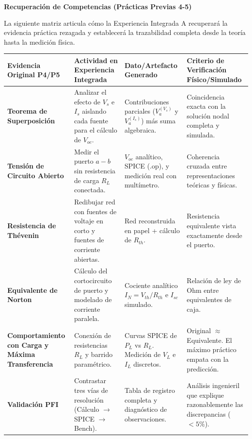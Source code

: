\documentclass[11pt, a4paper]{article}
\begin{document}
\begin{tcolorbox}[colback=ucbblue!5!white, colframe=ucbblue, title=\textbf{Matriz de Trazabilidad de Evidencia: Experiencia Integrada A}]
    \centering \textbf{Recuperación de Competencias (Prácticas Previas 4-5)}
\end{tcolorbox}

\noindent La siguiente matriz articula cómo la Experiencia Integrada A recuperará la evidencia práctica rezagada y establecerá la trazabilidad completa desde la teoría hasta la medición física.

\vspace{0.5cm}
\noindent\renewcommand{\arraystretch}{1.6}
\begin{tabularx}{\textwidth}{|>{\columncolor{ucbblue!10}\bfseries\RaggedRight}X|>{\RaggedRight}X|>{\RaggedRight}X|>{\RaggedRight}X|}
\hline
\rowcolor{ucbblue!20}
\textbf{Evidencia Original P4/P5} & \textbf{Actividad en Experiencia Integrada} & \textbf{Dato/Artefacto Generado} & \textbf{Criterio de Verificación Físico/Simulado} \\
\hline
Teorema de Superposición & Analizar el efecto de $V_s$ e $I_s$ aislando cada fuente para el cálculo de $V_{oc}$. & Contribuciones parciales ($V_a^{(V_s)}$ y $V_a^{(I_s)}$) más suma algebraica. & Coincidencia exacta con la solución nodal completa y simulada. \\
\hline
Tensión de Circuito Abierto & Medir el puerto $a-b$ sin resistencia de carga $R_L$ conectada. & $V_{oc}$ analítico, SPICE (.op), y medición real con multímetro. & Coherencia cruzada entre representaciones teóricas y físicas. \\
\hline
Resistencia de Thévenin & Redibujar red con fuentes de voltaje en corto y fuentes de corriente abiertas. & Red reconstruida en papel + cálculo de $R_{th}$. & Resistencia equivalente vista exactamente desde el puerto. \\
\hline
Equivalente de Norton & Cálculo del cortocircuito de puerto y modelado de corriente paralela. & Cociente analítico $I_N = V_{th}/R_{th}$ e $I_{sc}$ simulado. & Relación de ley de Ohm entre equivalentes de caja. \\
\hline
Comportamiento con Carga y Máxima Transferencia & Conexión de resistencias $R_L$ y barrido paramétrico. & Curvas SPICE de $P_L$ vs $R_L$. Medición de $V_L$ e $I_L$ discretos. & Original $\approx$ Equivalente. El máximo práctico empata con la predicción. \\
\hline
Validación PFI & Contrastar tres vías de resolución (Cálculo $\rightarrow$ SPICE $\rightarrow$ Bench). & Tabla de registro completa y diagnóstico de observaciones. & Análisis ingenieril que explique razonablemente las discrepancias ($<5\%$). \\
\hline
\end{tabularx}
\end{document}
